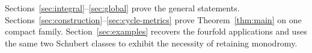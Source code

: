 Sections~\ref{sec:integral}--\ref{sec:global} prove the general
statements. Sections~\ref{sec:construction}--\ref{sec:cycle-metrics}
prove Theorem~\ref{thm:main} on one compact family.
Section~\ref{sec:examples} recovers the fourfold applications
and uses the same two Schubert classes to exhibit the necessity
of retaining monodromy.
